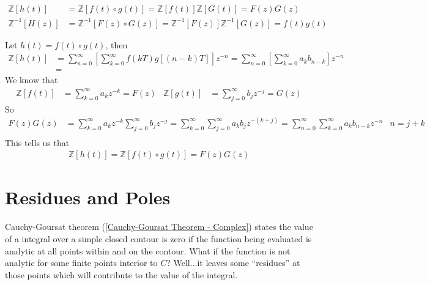 \documentclass[12pt, english]{book}
\makeatletter
\renewenvironment{proof}[1][\proofname]{\par
	\pushQED{\qed}%
	\normalfont \topsep6\p@\@plus6\p@\relax
	\list{}{%
		\settowidth{\leftmargin}{\itshape\proofname:\hskip\labelsep}%
		\setlength{\labelwidth}{0pt}%
		\setlength{\itemindent}{-\leftmargin}%
		}%
	\item[\hskip\labelsep\itshape#1\@addpunct{:}]\ignorespaces
	}{\popQED\endlist\@endpefalse}
\makeatother
\begin{document}
	\begin{definition}
		  
		\begin{align*}
			\mathbb{Z}[h(t)] &= \mathbb{Z}[f(t) \circ g(t)] = \mathbb{Z}[f(t)] \mathbb{Z}[G(t)]= F(z) G(z) \\
			\mathbb{Z}^{-1}[H(z)] &= \mathbb{Z}^{-1}[F(z) \circ G(z)] = \mathbb{Z}^{-1}[F(z)] \mathbb{Z}^{-1}[G(z)] = f(t) g(t)
		\end{align*}
	\end{definition}
	\begin{proof}
		Let \(h(t) = f(t) \circ g(t)\), then 
		\begin{align*}
			\mathbb{Z}[h(t)] 
			&= \sum_{n=0}^{\infty} \left[\sum_{k=0}^{\infty} f(kT) g[(n-k)T] \right] z^{-n} 
			 = \sum_{n=0}^{\infty} \left[\sum_{k=0}^{\infty} a_k b_{n-k} \right] z^{-n} \\
			&= 
		\end{align*}
		We know that 
		\begin{align*}
			\mathbb{Z}[f(t)] &= \sum_{k=0}^{\infty} a_k z^{-k} = F(z) & 
			\mathbb{Z}[g(t)] &= \sum_{j=0}^{\infty} b_j z^{-j} = G(z)
		\end{align*}
		So
		\begin{align*}
			F(z)G(z) &= \sum_{k=0}^{\infty} a_k z^{-k} \sum_{j=0}^{\infty} b_j z^{-j}
					  = \sum_{k=0}^{\infty} \sum_{j=0}^{\infty} a_k b_j z^{-(k+j)} 
					  = \sum_{n=0}^{\infty} \sum_{k=0}^{\infty} a_k b_{n-k} z^{-n} & n = j+k \\
		\end{align*}
		This tells us that 
		\begin{align*}
			\mathbb{Z}[h(t)] = \mathbb{Z}[f(t) \circ g(t)] = F(z) G(z)
		\end{align*}
	\end{proof}



	\chapter{Residues and Poles} \label{Residues and Poles Chapter - Complex}
	
	Cauchy-Goursat theorem (\cref{Cauchy-Goursat Theorem - Complex}) states the value of a integral over a simple closed contour is zero if the function being evaluated is analytic at all points within and on the contour. What if the function is not analytic for some finite points interior to \(C\)? Well...it leaves some ``residues'' at those points which will contribute to the value of the integral.
	
\end{document}
